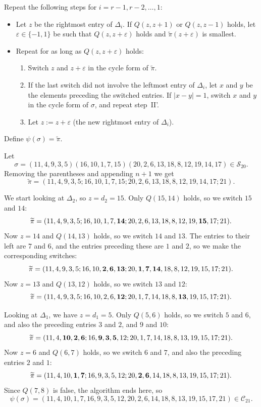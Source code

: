\documentclass[11pt]{amsart}
\newcounter{Examplecount}
\newenvironment{example}[1][Example \arabic{Examplecount}.]{\vskip3pt \begin{trivlist}
\item[\hskip \labelsep {\bfseries #1}]}{\end{trivlist}\vskip2pt\stepcounter{Examplecount}}
\newcommand\ben{\begin{enumerate}}
\newcommand\een{\end{enumerate}}
\newcommand\bit{\begin{itemize}}
\newcommand\eit{\end{itemize}}
\newcommand\ms{\medskip}
\renewcommand\S{\mathcal S}
\newcommand\C{\mathcal C}
\newcommand\wt{\widetilde}
\newcommand\inv{\psi}
\newcommand\eps{\varepsilon}
\newcommand\pim{\wt\pi}
\begin{document}
Repeat the following steps for  $i=r{-}1,r{-}2,\dots,1$:
\bit
\item Let $z$ be the rightmost entry of $\Delta_i$. If $Q(z,z+1)$ or $Q(z,z-1)$ holds, let $\eps\in\{-1,1\}$ be such that $Q(z,z+\eps)$ holds and $\pim(z+\eps)$ is smallest.
\item Repeat for as long as $Q(z,z+\eps)$ holds:
\ben\renewcommand{\labelenumi}{\Roman{enumi}'.}
\item Switch $z$ and $z+\eps$ in the cycle form of $\pim$.
\item If the last switch did not involve the leftmost entry of $\Delta_i$, let $x$ and $y$ be the elements preceding the switched entries. If $|x-y|=1$, switch $x$ and $y$ in the cycle form of $\sigma$, and repeat step~II'.
\item Let $z:=z+\eps$ (the new rightmost entry of $\Delta_i$).
\een
\eit

Define $\inv(\sigma)=\pim$.

\ms

\begin{example}
Let $$\sigma=(11,4,9,3,5)(16,10,1,7,15)(20,2,6,13,18,8,12,19,14,17)\in\S_{20}.$$
Removing the parentheses and appending $n+1$ we get $$\pim=(11,4,9,3,5;16,10,1,7,15;20,2,6,13,18,8,12,19,14,17;21).$$

We start looking at $\Delta_2$, so $z=d_2=15$. Only $Q(15,14)$ holds, so we switch $15$ and $14$:
$$\pim=(11,4,9,3,5;16,10,1,7,{\bf 14};20,2,6,13,18,8,12,19,{\bf 15},17;21).$$
Now $z=14$ and $Q(14,13)$ holds, so we switch $14$ and $13$. The entries to their left are $7$ and $6$, and the entries preceding these are $1$ and $2$, so we make the corresponding switches:
$$\pim=(11,4,9,3,5;16,10,{\bf 2},{\bf 6},{\bf 13};20,{\bf 1},{\bf 7},{\bf 14},18,8,12,19,15,17;21).$$
Now $z=13$ and $Q(13,12)$ holds, so we switch $13$ and $12$:
$$\pim=(11,4,9,3,5;16,10,2,6,{\bf 12};20,1,7,14,18,8,{\bf 13},19,15,17;21).$$

Looking at $\Delta_1$, we have $z=d_1=5$. Only $Q(5,6)$ holds, so we switch $5$ and $6$, and also the preceding entries $3$ and $2$, and $9$ and $10$:
$$\pim=(11,4,{\bf 10},{\bf 2},{\bf 6};16,{\bf 9},{\bf 3},{\bf 5},12;20,1,7,14,18,8,13,19,15,17;21).$$
Now $z=6$ and $Q(6,7)$ holds, so we switch $6$ and $7$, and also the preceding entries $2$ and $1$:
$$\pim=(11,4,10,{\bf 1},{\bf 7};16,9,3,5,12;20,{\bf 2},{\bf 6},14,18,8,13,19,15,17;21).$$
Since $Q(7,8)$ is false, the algorithm ends here, so
$$\inv(\sigma)=(11,4,10,1,7,16,9,3,5,12,20,2,6,14,18,8,13,19,15,17,21)\in\C_{21}.$$
\end{example}
\end{document}
